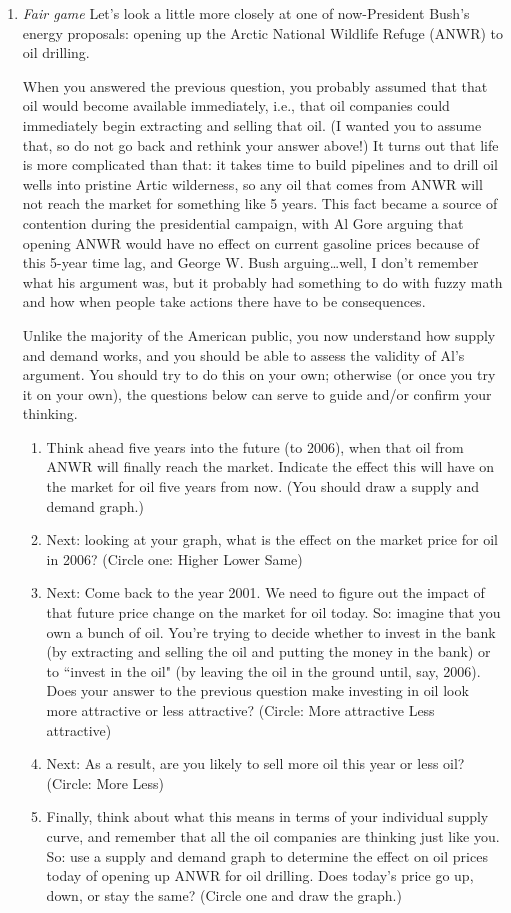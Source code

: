 \documentclass{article}
\begin{document}
\begin{enumerate}
\item \emph{Fair game} Let's look a little more closely at one of now-President Bush's energy proposals: opening up the Arctic National Wildlife Refuge (ANWR) to oil drilling. 

When you answered the previous question, you probably assumed that that oil would become available immediately, i.e., that oil companies could immediately begin extracting and selling that oil. (I wanted you to assume that, so do not go back and rethink your answer above!) It turns out that life is more complicated than that: it takes time to build pipelines and to drill oil wells into pristine Artic wilderness, so any oil that comes from ANWR will not reach the market for something like 5 years. This fact became a source of contention during the presidential campaign, with Al Gore arguing that opening ANWR would have no effect on current gasoline prices because of this 5-year time lag, and George W. Bush arguing\ldots well, I don't remember what his argument was, but it probably had something to do with fuzzy math and how when people take actions there have to be consequences.

Unlike the majority of the American public, you now understand how supply and demand works, and you should be able to assess the validity of Al's argument. You should try to do this on your own; otherwise (or once you try it on your own), the questions below can serve to guide and/or confirm your thinking.

	\begin{enumerate}
	\item Think ahead five years into the future (to 2006), when that oil from ANWR will finally reach the market. Indicate the effect this will have on the market for oil five years from now. (You should draw a supply and demand graph.)
	\item Next: looking at your graph, what is the effect on the market price for oil in 2006? (Circle one:  Higher   Lower    Same)
	\item Next: Come back to the year 2001. We need to figure out the impact of that future price change on the market for oil today. So: imagine that you own a bunch of oil. You're trying to decide whether to invest in the bank (by extracting and selling the oil and putting the money in the bank) or to ``invest in the oil" (by leaving the oil in the ground until, say, 2006). Does your answer to the previous question make investing in oil look more attractive or less attractive? (Circle: More attractive     Less attractive)
	\item Next: As a result, are you likely to sell more oil this year or less oil? (Circle:  More Less)
	\item Finally, think about what this means in terms of your individual supply curve, and remember that all the oil companies are thinking just like you. So: use a supply and demand graph to determine the effect on oil prices today of opening up ANWR for oil drilling. Does today's price go up, down, or stay the same? (Circle one and draw the graph.)
	\end{enumerate}

\end{enumerate}
\end{document}
